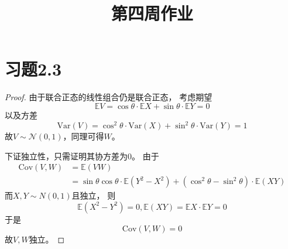 \documentclass[cn]{homework}
\title{第四周作业}
\newcommand{\E}{\mathbb E}
\newcommand{\var}{\mathrm{Var}}
\newcommand{\cov}{\mathrm{Cov}}
\begin{document}
    \maketitle

    \section{习题2.3}
    \begin{proof}
        由于联合正态的线性组合仍是联合正态，
        考虑期望
        \[\E V=\cos\theta\cdot\E X+\sin\theta\cdot\E Y=0\]
        以及方差
        \[\var(V)=\cos^2\theta\cdot\var(X)+\sin^2\theta\cdot\var(Y)=1\]
        故$V\sim\mathcal N(0,1)$，同理可得$W$。

        下证独立性，只需证明其协方差为0。
        由于
        \[\begin{aligned}
            \cov(V,W)&=\E (VW)\\
            &=\sin\theta\cos\theta\cdot\E(Y^2-X^2)
            +(\cos^2\theta-\sin^2\theta)\cdot\E (XY)
        \end{aligned}\]
        而$X,Y\sim N(0,1)$且独立，
        则
        \[\E(X^2-Y^2)=0,\E(XY)=\E X\cdot\E Y=0\]
        于是
        \[\cov(V,W)=0\]
        故$V,W$独立。
    \end{proof}
\end{document}
